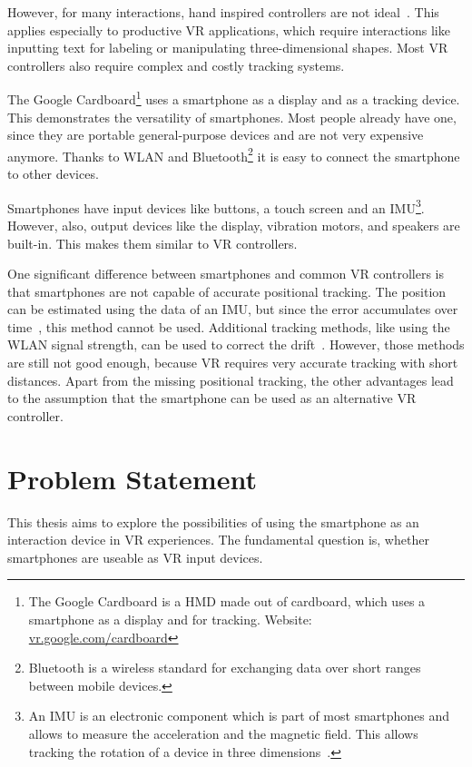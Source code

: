 However, for many interactions, hand inspired controllers are not ideal~\cite{Bowman.2012}. This applies especially to productive \gls{VR} applications, which require interactions like inputting text for labeling or manipulating three-dimensional shapes. Most \gls{VR} controllers also require complex and costly tracking systems.


The Google Cardboard\footnote{The Google Cardboard is a \gls{HMD} made out of cardboard, which uses a smartphone as a display and for tracking. Website: \href{https://vr.google.com/cardboard/}{vr.google.com/cardboard}} uses a smartphone as a display and as a tracking device. This demonstrates the versatility of smartphones. Most people already have one, since they are portable general-purpose devices and are not very expensive anymore. Thanks to \gls{WLAN} and Bluetooth\footnote{Bluetooth is a wireless standard for exchanging data over short ranges between mobile devices.} it is easy to connect the smartphone to other devices.

Smartphones have input devices like buttons, a touch screen and an \gls{IMU}\footnote{An IMU is an electronic component which is part of most smartphones and allows to measure the acceleration and the magnetic field. This allows tracking the rotation of a device in three dimensions~\cite[139]{Katzakis.2010}.}. However, also, output devices like the display, vibration motors, and speakers are built-in. This makes them similar to \gls{VR} controllers.

One significant difference between smartphones and common \gls{VR} controllers is that smartphones are not capable of accurate positional tracking. The position can be estimated using the data of an \gls{IMU}, but since the error accumulates over time~\cite[44]{Steed.2013}, this method cannot be used. Additional tracking methods, like using the \gls{WLAN} signal strength, can be used to correct the drift~\cite{Zhang.2015}. However, those methods are still not good enough, because \gls{VR} requires very accurate tracking with short distances.
Apart from the missing positional tracking, the other advantages lead to the assumption that the smartphone can be used as an alternative \gls{VR} controller.


\section{Problem Statement}\label{section:problem-statement}
This thesis aims to explore the possibilities of using the smartphone as an interaction device in \gls{VR} experiences. The fundamental question is, whether smartphones are useable as \gls{VR} input devices.


